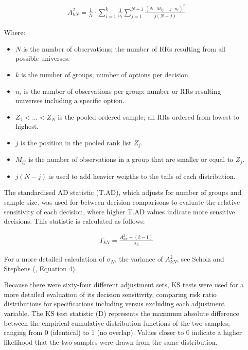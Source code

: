 \documentclass[
  man,
  floatsintext,
  longtable,
  nolmodern,
  notxfonts,
  notimes,
  colorlinks=true,linkcolor=blue,citecolor=blue,urlcolor=blue]{apa7}
\providecommand{\tightlist}{%
  \setlength{\itemsep}{0pt}\setlength{\parskip}{0pt}}
\begin{document}
\begin{align}
  A_{kN}^2 = \frac{1}{N} \cdot \sum_{i=1}^k \frac{1}{n_i} \sum_{j=1}^{N-1} \frac{(N \cdot M_{ij} - j \cdot n_i)^2}{j(N - j)}
\end{align}

Where:

\begin{itemize}
\tightlist
\item
  \(N\) is the number of observations; the number of RRs resulting from
  all possible universes.
\item
  \(k\) is the number of groups; number of options per decision.
\item
  \(n_i\) is the number of observations per group; number or RRs
  resulting universes including a specific option.
\item
  \(Z_1 < ... < Z_N\) is the pooled ordered sample; all RRs ordered from
  lowest to highest.
\item
  \(j\) is the position in the pooled rank list \(Z_j\).
\item
  \(M_{ij}\) is the number of observations in a group that are smaller
  or equal to \(Z_j\).
\item
  \(j(N - j)\) is used to add heavier weigths to the tails of each
  distribution.
\end{itemize}

The standardised AD statistic (T.AD), which adjusts for number of groups
and sample size, was used for between-decision comparisons to evaluate
the relative sensitivity of each decision, where higher T.AD values
indicate more sensitive decisions. This statistic is calculated as
follows:

\begin{align}
  T_{kN} = \frac{A_{kN}^2 - (k - 1)}{\sigma_N}
\end{align}

For a more detailed calculation of \(\sigma_N\), the variance of
\(A_{kN}^2\), see Scholz and Stephens
(, Equation 4).

Because there were sixty-four different adjustment sets, KS tests were
used for a more detailed evaluation of its decision sensitivity,
comparing risk ratio distributions for specifications including versus
excluding each adjustment variable. The KS test statistic (D) represents
the maximum absolute difference between the empirical cumulative
distribution functions of the two samples, ranging from 0 (identical) to
1 (no overlap). Values closer to 0 indicate a higher likelihood that the
two samples were drawn from the same distribution.
\end{document}
